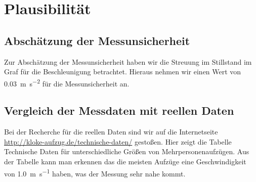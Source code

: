 \chapter{Plausibilität}
    \section{Abschätzung der Messunsicherheit}
            Zur Abschätzung der Messunsicherheit haben wir die Streuung im Stillstand im Graf für die Beschleunigung betrachtet. Hieraus nehmen wir einen Wert von \SI{0,03}{\meter\per\square\second} für die Messunsicherheit an.
    \section{Vergleich der Messdaten mit reellen Daten}
        Bei der Recherche für die reellen Daten sind wir auf die Internetseite \href{http://kloke-aufzug.de/technische-daten/}{http://kloke-aufzug.de/technische-daten/} gestoßen. 
        Hier zeigt die Tabelle Technische Daten für unterschiedliche Größen von Mehrpersonenaufzügen. 
        Aus der Tabelle kann man erkennen das die meisten Aufzüge eine Geschwindigkeit von \SI{1,0}{\meter\per\second} haben, was der Messung sehr nahe kommt.
